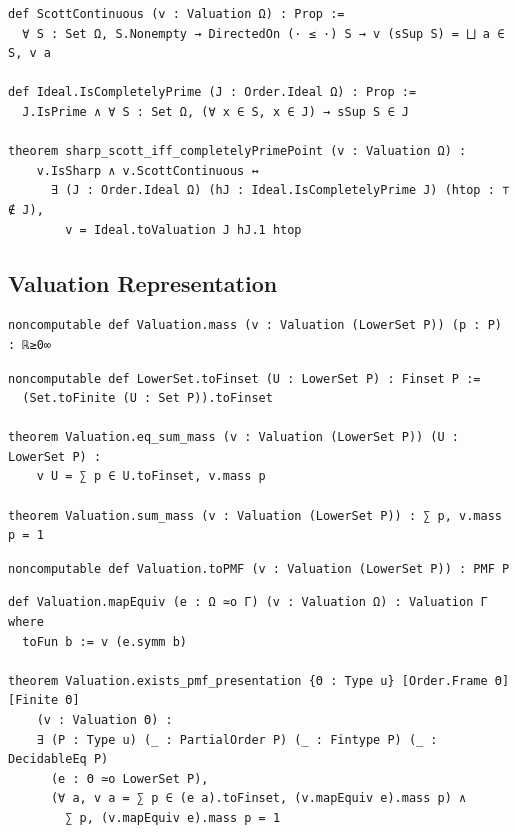 \label{lean:sharp-scott-iff-completelyprimepoint}
\begin{lstlisting}
def ScottContinuous (v : Valuation Ω) : Prop :=
  ∀ S : Set Ω, S.Nonempty → DirectedOn (· ≤ ·) S → v (sSup S) = ⨆ a ∈ S, v a

def Ideal.IsCompletelyPrime (J : Order.Ideal Ω) : Prop :=
  J.IsPrime ∧ ∀ S : Set Ω, (∀ x ∈ S, x ∈ J) → sSup S ∈ J

theorem sharp_scott_iff_completelyPrimePoint (v : Valuation Ω) :
    v.IsSharp ∧ v.ScottContinuous ↔
      ∃ (J : Order.Ideal Ω) (hJ : Ideal.IsCompletelyPrime J) (htop : ⊤ ∉ J),
        v = Ideal.toValuation J hJ.1 htop
\end{lstlisting}

\subsection{Valuation Representation}

\label{lean:valuation-mass}
\begin{lstlisting}
noncomputable def Valuation.mass (v : Valuation (LowerSet P)) (p : P) : ℝ≥0∞
\end{lstlisting}

\label{lean:valuation-eq-sum-mass}
\begin{lstlisting}
noncomputable def LowerSet.toFinset (U : LowerSet P) : Finset P :=
  (Set.toFinite (U : Set P)).toFinset

theorem Valuation.eq_sum_mass (v : Valuation (LowerSet P)) (U : LowerSet P) :
    v U = ∑ p ∈ U.toFinset, v.mass p

theorem Valuation.sum_mass (v : Valuation (LowerSet P)) : ∑ p, v.mass p = 1
\end{lstlisting}

\label{lean:valuation-topmf}
\begin{lstlisting}
noncomputable def Valuation.toPMF (v : Valuation (LowerSet P)) : PMF P
\end{lstlisting}

\label{lean:valuation-exists-pmf-presentation}
\begin{lstlisting}
def Valuation.mapEquiv (e : Ω ≃o Γ) (v : Valuation Ω) : Valuation Γ where
  toFun b := v (e.symm b)

theorem Valuation.exists_pmf_presentation {Θ : Type u} [Order.Frame Θ] [Finite Θ]
    (v : Valuation Θ) :
    ∃ (P : Type u) (_ : PartialOrder P) (_ : Fintype P) (_ : DecidableEq P)
      (e : Θ ≃o LowerSet P),
      (∀ a, v a = ∑ p ∈ (e a).toFinset, (v.mapEquiv e).mass p) ∧
        ∑ p, (v.mapEquiv e).mass p = 1
\end{lstlisting}

